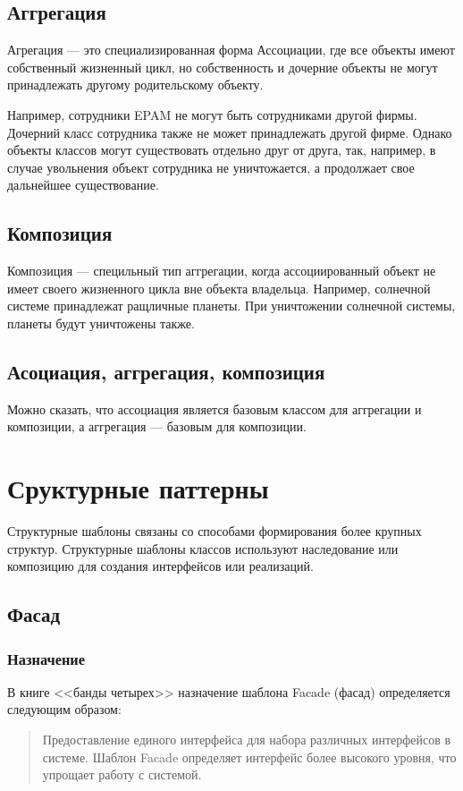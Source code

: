 \documentclass[10pt]{article}
\begin{document}
\subsection{Аггрегация}
Агрегация --- это специализированная форма Ассоциации,
где все объекты имеют собственный жизненный цикл, но собственность и
дочерние объекты не могут принадлежать другому родительскому объекту.

Например, сотрудники EPAM не могут быть сотрудниками другой фирмы.
Дочерний класс сотрудника также не может принадлежать другой фирме.
Однако объекты классов могут существовать отдельно друг от друга, так, например,
в случае увольнения объект сотрудника не уничтожается, а продолжает свое дальнейшее
существование.

\subsection{Композиция}
Композиция --- специльный тип аггрегации, когда ассоциированный объект
не имеет своего жизненного цикла вне объекта владельца. Например, солнечной
системе принадлежат ращличные планеты. При уничтожении солнечной системы, планеты
будут уничтожены также.

\subsection{Асоциация, аггрегация, композиция}
Можно сказать, что ассоциация является базовым классом для аггрегации и композиции,
а аггрегация --- базовым для композиции.

\section{Сруктурные паттерны}
Структурные шаблоны связаны со способами формирования более крупных структур.
Структурные шаблоны классов используют наследование или композицию для создания интерфейсов или реализаций.
\subsection{Фасад}
\subsubsection{Назначение}
В книге <<банды четырех>> назначение шаблона Facade (фасад) определяется
следующим образом:
\begin{quote}
Предоставление единого интерфейса для набора различных интерфейсов в системе.
Шаблон Facade определяет интерфейс более высокого уровня, что упрощает
работу с системой.
\end{quote}
\end{document}
